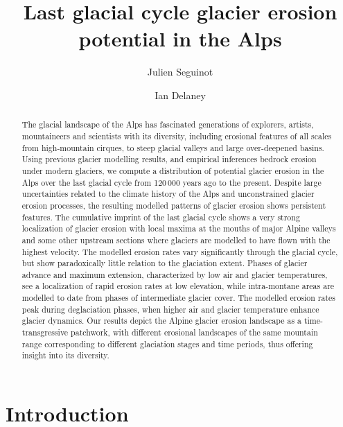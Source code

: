 \documentclass[utf8]{article}
\title{Last glacial cycle glacier erosion potential in the Alps}
\author[1]{Julien Seguinot}
\author[2]{Ian Delaney}
\affil[1]{Anafi, Greece} %
\affil[2]{Institute of Earth Surface Dynamics, University of Lausanne, Switzerland}
\begin{document}

\maketitle

\begin{abstract}

    The glacial landscape of the Alps has fascinated generations of explorers,
    artists, mountaineers and scientists with its diversity, including
    erosional features of all scales from high-mountain cirques, to steep
    glacial valleys and large over-deepened basins. Using previous glacier
    modelling results, and empirical inferences bedrock erosion under modern
    glaciers, we compute a distribution of potential glacier erosion in the Alps
    over the last glacial cycle from 120\,000 years ago to the present.
    Despite large uncertainties related to the climate history of the Alps and
    unconstrained glacier erosion processes, the resulting modelled patterns of
    glacier erosion shows persistent features. The cumulative imprint of
    the last glacial cycle shows a very strong localization of glacier erosion
    with local maxima at the mouths of major Alpine valleys and some other
    upstream sections where glaciers are modelled to have flown with the
    highest velocity. The modelled erosion rates vary significantly through the
    glacial cycle, but show paradoxically little relation to the glaciation
    extent. Phases of glacier advance and maximum extension, characterized by
    low air and glacier temperatures, see a localization of rapid erosion rates
    at low elevation, while intra-montane areas are modelled to date from phases
    of intermediate glacier cover. The modelled erosion rates peak during
    deglaciation phases, when higher air and glacier temperature enhance
    glacier dynamics.
    Our results depict the Alpine glacier erosion landscape as a
    time-transgressive patchwork, with different erosional landscapes of the
    same mountain range corresponding to different glaciation stages and time
    periods, thus offering insight into its diversity.

\end{abstract}


\section{Introduction}
\end{document}
